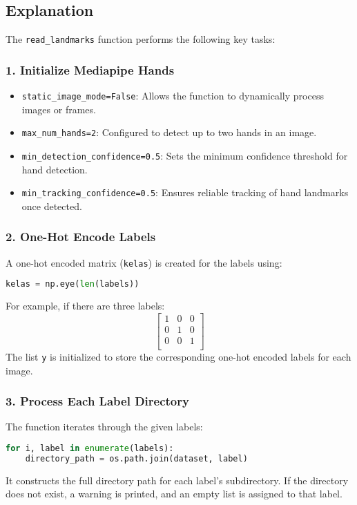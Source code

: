 \subsection*{Explanation}

The \texttt{read\_landmarks} function performs the following key tasks:

\subsubsection*{1. Initialize Mediapipe Hands}
\begin{itemize}
	\item \texttt{static\_image\_mode=False}: Allows the function to dynamically process images or frames.
	\item \texttt{max\_num\_hands=2}: Configured to detect up to two hands in an image.
	\item \texttt{min\_detection\_confidence=0.5}: Sets the minimum confidence threshold for hand detection.
	\item \texttt{min\_tracking\_confidence=0.5}: Ensures reliable tracking of hand landmarks once detected.
\end{itemize}

\subsubsection*{2. One-Hot Encode Labels}
A one-hot encoded matrix (\texttt{kelas}) is created for the labels using:
\begin{lstlisting}[language=Python]
	kelas = np.eye(len(labels))
\end{lstlisting}
For example, if there are three labels:
\[
\begin{bmatrix}
	1 & 0 & 0 \\
	0 & 1 & 0 \\
	0 & 0 & 1 \\
\end{bmatrix}
\]
The list \texttt{y} is initialized to store the corresponding one-hot encoded labels for each image.

\subsubsection*{3. Process Each Label Directory}
The function iterates through the given labels:
\begin{lstlisting}[language=Python]
	for i, label in enumerate(labels):
	directory_path = os.path.join(dataset, label)
\end{lstlisting}
It constructs the full directory path for each label's subdirectory. If the directory does not exist, a warning is printed, and an empty list is assigned to that label.

